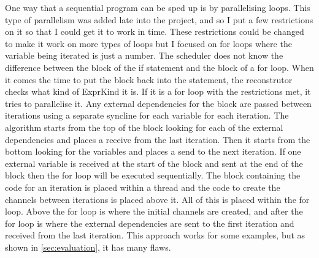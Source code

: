 One way that a sequential program can be sped up is by parallelising loops. This type of parallelism was added late into the project, and so I put a few restrictions on it so that I could get it to work in time. These restrictions could be changed to make it work on more types of loops but I focused on for loops where the variable being iterated is just a number. The scheduler does not know the difference between the block of the if statement and the block of a for loop. When it comes the time to put the block back into the statement, the reconstrutor checks what kind of ExprKind it is. If it is a for loop with the restrictions met, it tries to parallelise it. Any external dependencies for the block are passed between iterations using a separate syncline for each variable for each iteration. The algorithm starts from the top of the block looking for each of the external dependencies and places a receive from the last iteration. Then it starts from the bottom looking for the variables and places a send to the next iteration. If one external variable is received at the start of the block and sent at the end of the block then the for loop will be executed sequentially. The block containing the code for an iteration is placed within a thread and the code to create the channels between iterations is placed above it. All of this is placed within the for loop. Above the for loop is where the initial channels are created, and after the for loop is where the external dependencies are sent to the first iteration and received from the last iteration. This approach works for some examples, but as shown in \autoref{sec:evaluation}, it has many flaws.

\begin{comment}
\begin{code}
\begin{verbatim}
let a; // Local without init
a = {
    let b = vec![1,2,3]; // Local with init
    println!("{:?}", b); // Mac
    b.len() // Expr
}; // Semi
\end{verbatim}
\caption{Example showing different StmtKinds}
\end{code}
\end{comment}
